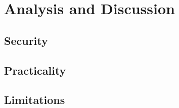 \section{Analysis and Discussion} \label{sect:analysis}


\subsection{Security}



\subsection{Practicality}



\subsection{Limitations}